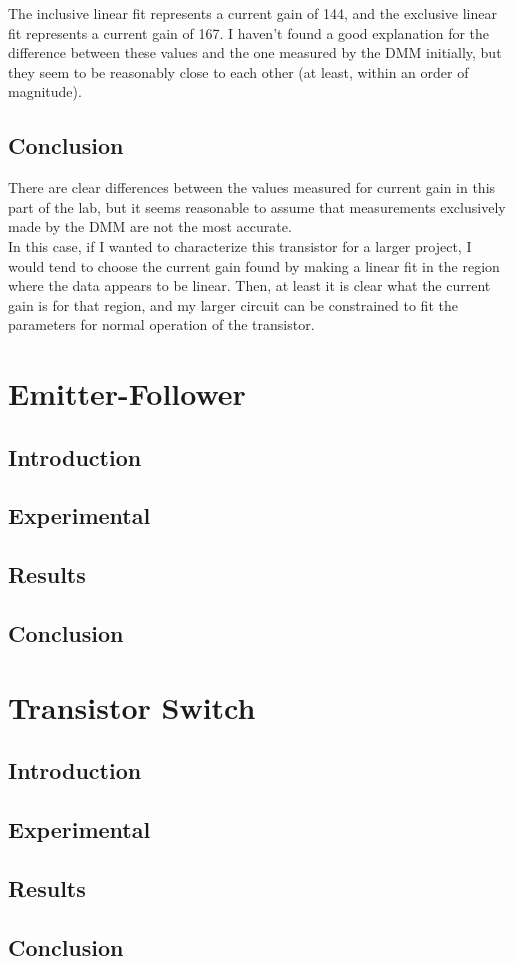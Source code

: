 \documentclass[11pt]{article}
\begin{document}
The inclusive linear fit represents a current gain of 144, and the exclusive linear fit represents a current gain of 167. I haven't found a good explanation for the difference between these values and the one measured by the DMM initially, but they seem to be reasonably close to each other (at least, within an order of magnitude).\\

\subsection{Conclusion}

There are clear differences between the values measured for current gain in this part of the lab, but it seems reasonable to assume that measurements exclusively made by the DMM are not the most accurate.\\

In this case, if I wanted to characterize this transistor for a larger project, I would tend to choose the current gain found by making a linear fit in the region where the data appears to be linear. Then, at least it is clear what the current gain is for that region, and my larger circuit can be constrained to fit the parameters for normal operation of the transistor.\\
    

\section{Emitter-Follower}
\subsection{Introduction}

\subsection{Experimental}

\subsection{Results}

\subsection{Conclusion}


\section{Transistor Switch}
\subsection{Introduction}

\subsection{Experimental}

\subsection{Results}

\subsection{Conclusion}
\end{document}
